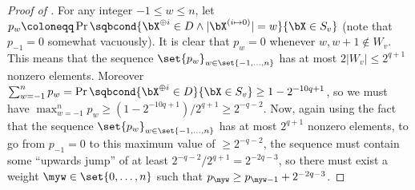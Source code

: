 \begin{proof}[Proof of ]
For any integer $-1 \leq w \leq n$, let $p_w \coloneqq \Pr\sqbcond{\bX^{\oplus i} \in D \wedge |\bX^{(i \mapsto 0)}| = w}{\bX \in S_v}$ (note that $p_{-1} = 0$ somewhat vacuously).
It is clear that $p_w = 0$ whenever $w,w+1 \not\in W_v$.
This means that the sequence $\set{p_w}_{w\in\set{-1,\ldots, n}}$ has at most $2|W_v| \leq 2^{q+1}$ nonzero elements.
Moreover $\sum_{w =-1}^n p_w = \Pr\sqbcond{\bX^{\oplus i} \in D}{\bX \in S_v} \geq 1- 2^{-10q+1}$, so we must have $\max_{w=-1}^n p_w \geq (1-2^{-10q+1})/2^{q+1} \geq 2^{-q-2}$.
Now, again using the fact that the sequence $\set{p_w}_{w\in\set{-1,\ldots, n}}$ has at most $2^{q+1}$ nonzero elements, to go from $p_{-1}=0$ to this maximum value of $\geq 2^{-q-2}$, the sequence must contain some ``upwards jump'' of at least $2^{-q-2}/2^{q+1} = 2^{-2q-3}$, so there must exist a weight $\myw \in \set{0,\ldots,n}$ such that $p_\myw \geq p_{\myw-1} + 2^{-2q-3}$.


\end{proof}

